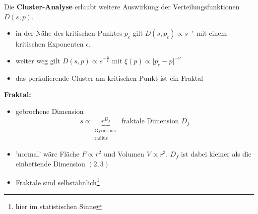 \documentclass[12pt]{article}
\begin{document}
Die \textbf{Cluster-Analyse} erlaubt weitere Auswirkung der Verteilungsfunktionen $D(s,p)$.
\begin{itemize}
\item in der Nähe des kritischen Punktes $p_c$ gilt $D(s,p_c) \propto s^{-\epsilon}$ mit einem kritischen Exponenten $\epsilon$.
\item weiter weg gilt $D(s,p) \propto e^{-\frac{s}{\xi}}$ mit $\xi (p) \propto \vert p_c - p \vert ^{- \nu}$
\item das perkulierende Cluster am kritischen Punkt ist ein Fraktal
\end{itemize}	 
\textbf{Fraktal:} 
\begin{itemize}
	\item gebrochene Dimension \begin{align}
	s \propto \underbrace{r^{D_f}}_{\substack{\text{Gyrations-} \\ \text{radius}}} \mbox{ fraktale Dimension } D_f
\end{align}	 
\item 'normal' wäre Fläche $F \propto r^2$ und Volumen $V \propto r^3$. $D_f$ ist dabei kleiner als die einbettende Dimension $(2,3)$
\item Fraktale sind selbstähnlich\footnote{hier im statistischen Sinne}
\end{itemize}
\end{document}
